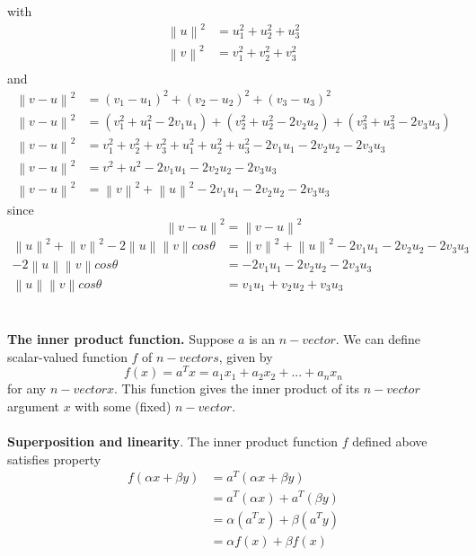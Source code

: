 \documentclass[a4paper, 12pt]{article}
\newcommand{\norm}[1]{\left\lVert#1\right\rVert}
\begin{document}
with\\
\begin{align*}
\norm{u}^2 &= u_1^2 + u_2^2 + u_3^2\\
\norm{v}^2 &= v_1^2 + v_2^2 + v_3^2\\
\end{align*} 
and\\
\begin{align*}
\norm{v - u}^2 &= (v_1 - u_1) ^2 + (v_2 - u_2)^2 + (v_3 - u_3)^2\\ 
\norm{v - u}^2 &= (v_1^2 + u_1^2 -2v_1u_1) + (v_2^2 + u_2^2 -  2v_2u_2) + (v_3^2 + u_3^2 - 2v_3u_3)\\ 
\norm{v - u}^2 & = v_1^2 + v_2^2 + v_3^2 + u_1^2 + u_2^2 + u_3^2 - 2v_1u_1 -2v_2u_2 - 2v_3u_3\\
\norm{v - u}^2 & = v^2 + u^2  - 2v_1u_1 -2v_2u_2 - 2v_3u_3 \\
\norm{v - u}^2 & = \norm{v}^2 + \norm{u}^2  - 2v_1u_1 -2v_2u_2 - 2v_3u_3 
\end{align*} 
since\\
\[
\norm{v - u}^2 = \norm{v - u}^2
\]
\begin{align*}
\norm{u}^2 + \norm{v}^2 - 2\norm{u}\norm{v}cos\theta &=  \norm{v}^2 + \norm{u}^2 - 2v_1u_1 -2v_2u_2 - 2v_3u_3 \\
- 2\norm{u}\norm{v}cos\theta &=  - 2v_1u_1 -2v_2u_2 - 2v_3u_3  \\
\norm{u}\norm{v}cos\theta &=  v_1u_1 + v_2u_2  + v_3u_3 
\end{align*}
\\
\\
\textbf{The inner product function.} Suppose $a$ is an $n-vector$. We can define scalar-valued
function $f$ of $n-vectors$, given by
\begin{equation}
f(x) = a^Tx = a_1x_1 + a_2x_2+...+a_nx_n
\end{equation}
for any $n-vector x$. This function gives the inner product of its $n-vector$ argument $x$ with
some (fixed) $n-vector$.
\\
\\ 
\textbf{Superposition and linearity}. The inner product function $f$ defined above satisfies
property
\begin{align*}
f(\alpha x +\beta y) &= a^T(\alpha x + \beta y) \\
&= a^T(\alpha x) + a^T(\beta y) \\
&= \alpha(a^Tx) + \beta(a^Ty) \\
&= \alpha f(x) + \beta f(x)
\end{align*}
\\
\end{document}
